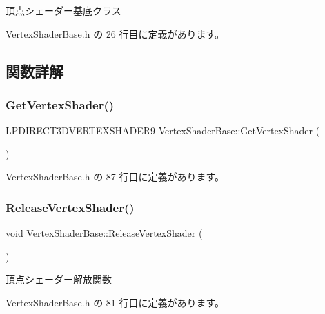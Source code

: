 頂点シェーダー基底クラス 

 Vertex\+Shader\+Base.\+h の 26 行目に定義があります。



\subsection{関数詳解}
\mbox{\label{class_vertex_shader_base_ab10cf1aac4a54653c553b5c84e1d3703}} 
\subsubsection{\texorpdfstring{Get\+Vertex\+Shader()}{GetVertexShader()}}
{\footnotesize\ttfamily L\+P\+D\+I\+R\+E\+C\+T3\+D\+V\+E\+R\+T\+E\+X\+S\+H\+A\+D\+E\+R9 Vertex\+Shader\+Base\+::\+Get\+Vertex\+Shader (\begin{DoxyParamCaption}{ }\end{DoxyParamCaption})\hspace{0.3cm}{\ttfamily [inline]}}



 Vertex\+Shader\+Base.\+h の 87 行目に定義があります。

\mbox{\label{class_vertex_shader_base_a42ff1e32a2c231f77d0ba0e6a8312e63}} 
\subsubsection{\texorpdfstring{Release\+Vertex\+Shader()}{ReleaseVertexShader()}}
{\footnotesize\ttfamily void Vertex\+Shader\+Base\+::\+Release\+Vertex\+Shader (\begin{DoxyParamCaption}{ }\end{DoxyParamCaption})\hspace{0.3cm}{\ttfamily [inline]}}



頂点シェーダー解放関数 



 Vertex\+Shader\+Base.\+h の 81 行目に定義があります。

